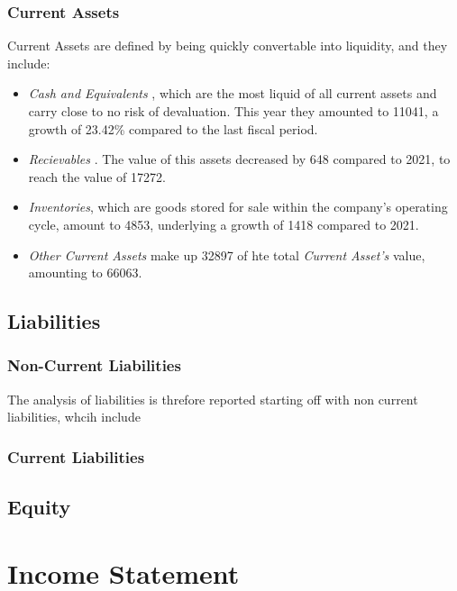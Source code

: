 \documentclass{article}
\begin{document}
\subsubsection{Current Assets}
Current Assets are defined by being quickly convertable into liquidity, and they include:
\begin{itemize}
  \item \textit{ Cash and Equivalents }, which are the most liquid of all current assets and carry close to no risk of devaluation. This year they amounted to 11041, a growth of 23.42\% compared to the last fiscal period.
  \item \textit{ Recievables }. The value of this assets decreased by 648 compared to 2021, to reach the value of 17272.
  \item \textit{Inventories}, which are goods stored for sale within the company's operating cycle, amount to 4853, underlying a growth of 1418 compared to 2021.
  \item \textit{Other Current Assets} make up 32897 of hte total \textit{Current Asset's} value, amounting to 66063.

\end{itemize}
\subsection{Liabilities}
\subsubsection{Non-Current Liabilities}
The analysis of liabilities is threfore reported starting off with non current liabilities, whcih include
\subsubsection{Current Liabilities}
\subsection{Equity}
\section{Income Statement} 
\end{document}
